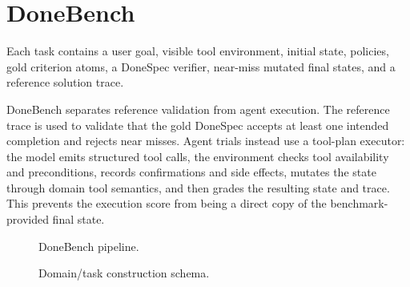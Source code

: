 \section{DoneBench}
Each task contains a user goal, visible tool environment, initial state, policies, gold criterion atoms, a DoneSpec verifier, near-miss mutated final states, and a reference solution trace.

DoneBench separates reference validation from agent execution. The reference trace is used to validate that the gold DoneSpec accepts at least one intended completion and rejects near misses. Agent trials instead use a tool-plan executor: the model emits structured tool calls, the environment checks tool availability and preconditions, records confirmations and side effects, mutates the state through domain tool semantics, and then grades the resulting state and trace. This prevents the execution score from being a direct copy of the benchmark-provided final state.

\begin{figure}[tbp]
\centering
{}
\caption{DoneBench pipeline.}
\end{figure}

\begin{figure}[tbp]
\centering
{}
\caption{Domain/task construction schema.}
\end{figure}
